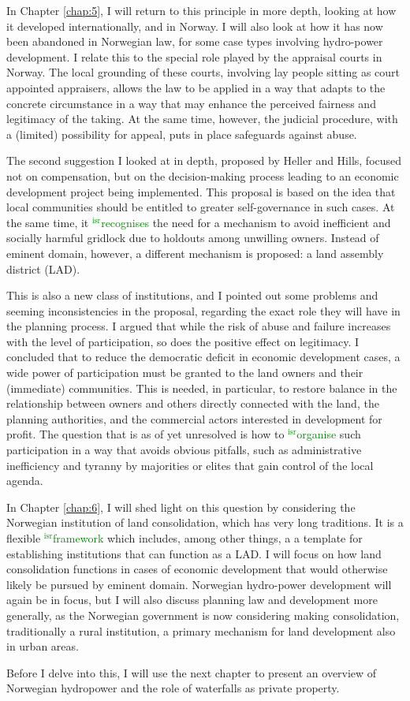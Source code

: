 \documentclass[12pt,a4paper]{book} %
\newcommand{\isr}[1]{\textcolor{green}{$^{\textrm{isr}}${#1}}}
\begin{document}
In Chapter \ref{chap:5}, I will return to this principle in more depth, looking at how it developed internationally, and in Norway. I will also look at how it has now been abandoned in Norwegian law, for some case types involving hydro-power development. I relate this to the special role played by the appraisal courts in Norway. The local grounding of these courts, involving lay people sitting as court appointed appraisers, allows the law to be applied in a way that adapts to the concrete circumstance in a way that may enhance the perceived fairness and legitimacy of the taking. At the same time, however, the judicial procedure, with a (limited) possibility for appeal, puts in place safeguards against abuse.

The second suggestion I looked at in depth, proposed by Heller and Hills, focused not on compensation, but on the decision-making process leading to an economic development project being implemented. This proposal is based on the idea that local communities should be entitled to greater self-governance in such cases. At the same time, it \isr{recognises} the need for a mechanism to avoid inefficient and socially harmful gridlock due to holdouts among unwilling owners. Instead of eminent domain, however, a different mechanism is proposed: a land assembly district (LAD). 

This is also a new class of institutions, and I pointed out some problems and seeming inconsistencies in the proposal, regarding the exact role they will have in the planning process. I argued that while the risk of abuse and failure increases with the level of participation, so does the positive effect on legitimacy. I concluded that to reduce the democratic deficit in economic development cases, a wide power of participation must be granted to the land owners and their (immediate) communities. This is needed, in particular, to restore balance in the relationship between owners and others directly connected with the land, the planning authorities, and the commercial actors interested in development for profit. The question that is as of yet unresolved is how to \isr{organise} such participation in a way that avoids obvious pitfalls, such as administrative inefficiency and tyranny by majorities or elites that gain control of the local agenda.

In Chapter \ref{chap:6}, I will shed light on this question by considering the Norwegian institution of land consolidation, which has very long traditions. It is a flexible \isr{framework} which includes, among other things, a a template for establishing institutions that can function as a LAD. I will focus on how land consolidation functions in cases of economic development that would otherwise likely be pursued by eminent domain. Norwegian hydro-power development will again be in focus, but I will also discuss planning law and development more generally, as the Norwegian government is now considering making consolidation, traditionally a rural institution, a primary mechanism for land development also in urban areas.

Before I delve into this, I will use the next chapter to present an overview of Norwegian hydropower and the role of waterfalls as private property.

\printbibliography
\end{document}

